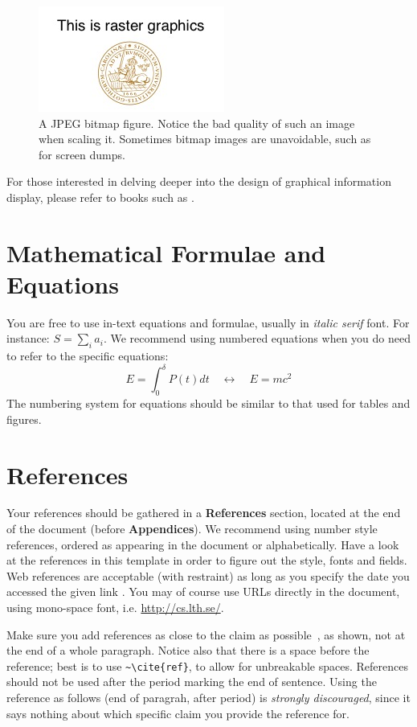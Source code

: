 \documentclass[nofilelist]{cslthse-msc}
\begin{document}
\begin{appendices}
\begin{figure}[!hbt]
\centering
\includegraphics[scale=2.5]{examplepic3.jpg} 
\caption{A JPEG bitmap figure. Notice the bad quality of such an image when scaling it. Sometimes bitmap images are unavoidable, such as for screen dumps.}\label{fig:rasterg}
\end{figure}
For those interested in delving deeper into the design of graphical information display, please refer to books such as \cite{Tufte:1986, few2012show}.

\section{Mathematical Formulae and Equations}
You are free to use in-text equations and formulae, usually in \textit{italic serif} font. For instance: $S = \sum_i a_i$. We recommend using numbered equations when you do need to refer to the specific equations:
\begin{equation}
E = \int_0^{\delta} P(t) dt \quad \longleftrightarrow \quad E = m c^2
\end{equation}
The numbering system for equations should be similar to that used for tables and figures.

\section{References}
Your references should be gathered in a \textbf{References} section, located at the end of the document (before \textbf{Appendices}). We recommend using number style references, ordered as appearing in the document or alphabetically. Have a look at the references in this template in order to figure out the style, fonts and fields. Web references are acceptable (with restraint) as long as you specify the date you accessed the given link \cite{fontspec, CTAN}. You may of course use URLs directly in the document, using mono-space font, i.e. \url{http://cs.lth.se/}.

Make sure you add references as close to the claim as possible~\cite{CTAN}, as shown, not at the end of a whole paragraph. Notice also that there is a space before the reference; best is to use \verb+~\cite{ref}+, to allow for unbreakable spaces. References should not be used after the period marking the end of sentence. Using the reference as follows (end of paragrah, after period) is {\em{strongly discouraged}}, since it says nothing about which specific claim you provide the reference for. \cite{fontspec} 


\end{appendices}
\end{document}
